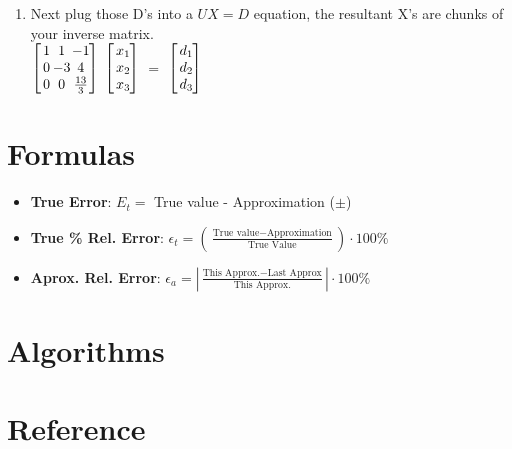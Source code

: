 \documentclass[fontsize=5pt]{scrartcl}
\makeatletter
\newenvironment{tmatrix3}%
{ 
  $\left[\hspace{-3.5pt}\begin{array}{c@{\hspace{1pt}}@{\hspace{1pt}}c@{\hspace{1pt}}c@{\hspace{3pt}}}
}%
{
   \end{array}\hspace{-3.5pt}\right]$
}
\newenvironment{tmatrix1}%
{ 
  $\left[\hspace{-3.5pt}\begin{array}{c@{\hspace{3pt}}}
}%
{
   \end{array}\hspace{-3.5pt}\right]$
}
\makeatother
\begin{document}
\begin{multicols}{3}
\begin{enumerate}
\begin{enumerate}
          \item Next plug those D's into a $UX=D$ equation, the resultant X's are chunks of your inverse matrix. \\
            \begin{tmatrix3}
              1 & 1  & -1 \\
              0 & -3 & 4  \\
              0 & 0  & \frac{13}{3}         
            \end{tmatrix3}%
            \begin{tmatrix1}
              x_1 \\
              x_2 \\ 
              x_3 \\
            \end{tmatrix1}$=$%
            \begin{tmatrix1}
              d_1 \\
              d_2 \\ 
              d_3 \\
            \end{tmatrix1}            
            

    \end{enumerate}
    
  \section{Formulas}
      \begin{itemize}
        \item \textbf{True Error}: $E_t =$ True value - Approximation ($\pm$)
        \item \textbf{True \% Rel. Error}: $\epsilon_t = (\frac{\text{True value} - \text{Approximation}}{\text{True Value}})\cdot100\%$
        \item \textbf{Aprox. Rel. Error}: $\epsilon_a =  |\frac{\text{This Approx.} - \text{Last Approx}}{\text{This Approx.}}|\cdot100\%$
      \end{itemize}
      
  \section{Algorithms}
    
      
  \section{Reference}

\end{enumerate}
\end{multicols}
\end{document}
